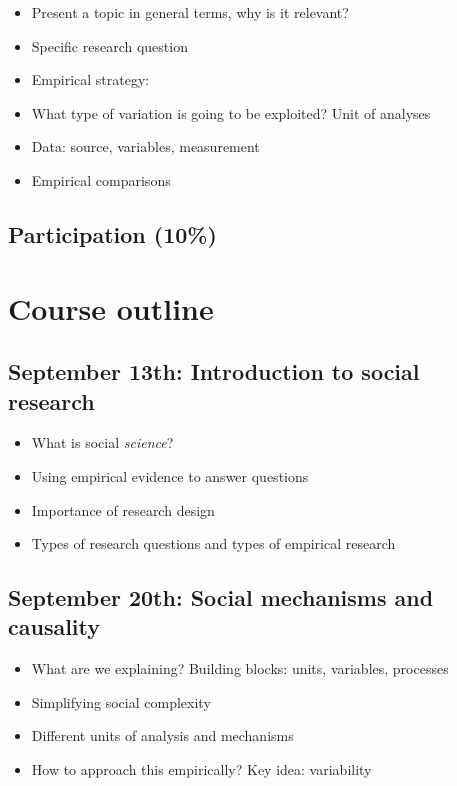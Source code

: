 \documentclass[12pt, a4paper]{article}
\begin{document}
\begin{itemize}
\setlength\itemsep{-5pt}
  \item Present a topic in general terms, why is it relevant?
  \item Specific research question
  \item Empirical strategy:
  \item[] What type of variation is going to be exploited? Unit of analyses
  \item[] Data: source, variables, measurement
  \item[] Empirical comparisons
\end{itemize}


\subsection*{Participation (10\%)}



\newpage
\section{Course outline}

\subsection*{September 13th: Introduction to social research}

\begin{itemize}
\setlength\itemsep{-5pt}
  \item What is social \textit{science}?
  \item Using empirical evidence to answer questions
  \item Importance of research design
  \item Types of research questions and types of empirical research
\end{itemize}

\subsection*{September 20th: Social mechanisms and causality}

\begin{itemize}
\setlength\itemsep{-5pt}
  \item What are we explaining? Building blocks: units, variables, processes
  \item Simplifying social complexity
  \item Different units of analysis and mechanisms
  \item How to approach this empirically? Key idea: variability
\end{itemize}
\end{document}
